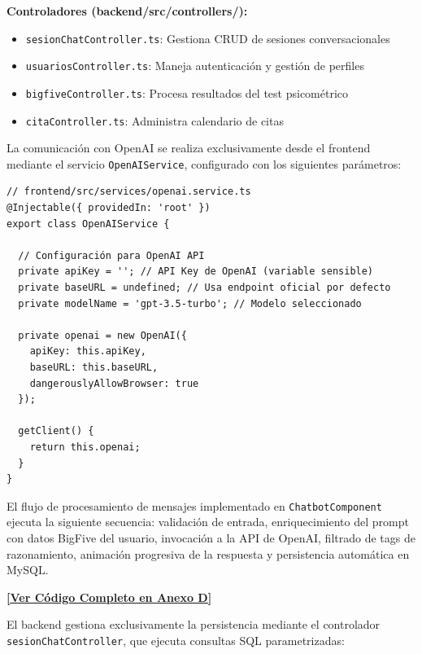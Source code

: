 \documentclass[12pt,a4paper]{report}
\numberwithin{figure}{section}
\begin{document}
\textbf{Controladores (backend\slash src\slash controllers\slash ):}
\begin{itemize}
  \item \texttt{sesionChatController.ts}: Gestiona CRUD de sesiones conversacionales
  \item \texttt{usuariosController.ts}: Maneja autenticación y gestión de perfiles
  \item \texttt{bigfiveController.ts}: Procesa resultados del test psicométrico
  \item \texttt{citaController.ts}: Administra calendario de citas
\end{itemize}

La comunicación con OpenAI se realiza exclusivamente desde el frontend mediante el servicio \texttt{OpenAIService}, configurado con los siguientes parámetros:

\begin{lstlisting}[style=angelcode,caption={Configuración real de OpenAIService para API en la nube}]
// frontend/src/services/openai.service.ts
@Injectable({ providedIn: 'root' })
export class OpenAIService {
  
  // Configuración para OpenAI API
  private apiKey = ''; // API Key de OpenAI (variable sensible)
  private baseURL = undefined; // Usa endpoint oficial por defecto
  private modelName = 'gpt-3.5-turbo'; // Modelo seleccionado
  
  private openai = new OpenAI({
    apiKey: this.apiKey,
    baseURL: this.baseURL,
    dangerouslyAllowBrowser: true
  });

  getClient() {
    return this.openai;
  }
}
\end{lstlisting}

El flujo de procesamiento de mensajes implementado en \texttt{ChatbotComponent} ejecuta la siguiente secuencia: validación de entrada, enriquecimiento del prompt con datos BigFive del usuario, invocación a la API de OpenAI, filtrado de tags de razonamiento, animación progresiva de la respuesta y persistencia automática en MySQL.
\label{lst:sendmessage-ref}

\vspace{0.5em}
\begin{center}
\hyperref[anexo:sendmessage]{\textbf{[Ver Código Completo en Anexo D]}}
\end{center}
\vspace{0.5em}

El backend gestiona exclusivamente la persistencia mediante el controlador \texttt{sesionChatController}, que ejecuta consultas SQL parametrizadas:
\end{document}
